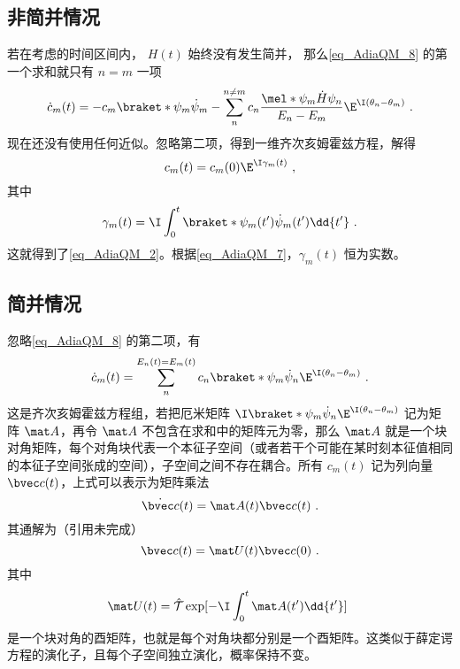 \subsection{非简并情况}
若在考虑的时间区间内， $H(t)$ 始终没有发生简并， 那么\autoref{eq_AdiaQM_8} 的第一个求和就只有 $n=m$ 一项
\begin{equation}
\dot c_m(t) = -c_m \braket*{\psi_m}{\dot\psi_m} - \sum_{n}^{n\ne m} c_n \frac{\mel*{\psi_m}{\dot H}{\psi_n}}{E_n-E_m} \E^{\I(\theta_n-\theta_m)}~.
\end{equation}
现在还没有使用任何近似。忽略第二项，得到一维齐次亥姆霍兹方程，解得
\begin{equation}
c_m(t) = c_m(0)\E^{\I\gamma_m(t)}~,
\end{equation}
其中
\begin{equation}
\gamma_m(t) = \I \int_0^t \braket*{\psi_m(t')}{\dot\psi_m(t')}\dd{t'}~.
\end{equation}
这就得到了\autoref{eq_AdiaQM_2}。根据\autoref{eq_AdiaQM_7}，$\gamma_m(t)$ 恒为实数。

\subsection{简并情况}
忽略\autoref{eq_AdiaQM_8} 的第二项，有
\begin{equation}
\dot c_m(t) = \sum_{n}^{E_n(t)=E_m(t)} c_n \braket*{\psi_m}{\dot\psi_n}\E^{\I(\theta_n-\theta_m)}~.
\end{equation}
这是齐次亥姆霍兹方程组，若把厄米矩阵 $\I\braket*{\psi_m}{\dot\psi_n}\E^{\I(\theta_n-\theta_m)}$ 记为矩阵 $\mat A$，再令 $\mat A$ 不包含在求和中的矩阵元为零，那么 $\mat A$ 就是一个块对角矩阵，每个对角块代表一个本征子空间（或者若干个可能在某时刻本征值相同的本征子空间张成的空间），子空间之间不存在耦合。所有 $c_m(t)$ 记为列向量 $\bvec c(t)$，上式可以表示为矩阵乘法
\begin{equation}
\dot{\bvec c}(t) = \mat A(t) \bvec c(t)~.
\end{equation}
其通解为（引用未完成）
\begin{equation}
\bvec c(t) = \mat U(t)\bvec c(0)~.
\end{equation}
其中
\begin{equation}
\mat U(t) = \hat{\mathcal{T}}\exp[-\I \int_0^t \mat A(t') \dd{t'}]~
\end{equation}
是一个块对角的酉矩阵，也就是每个对角块都分别是一个酉矩阵。这类似于薛定谔方程的演化子，且每个子空间独立演化，概率保持不变。

